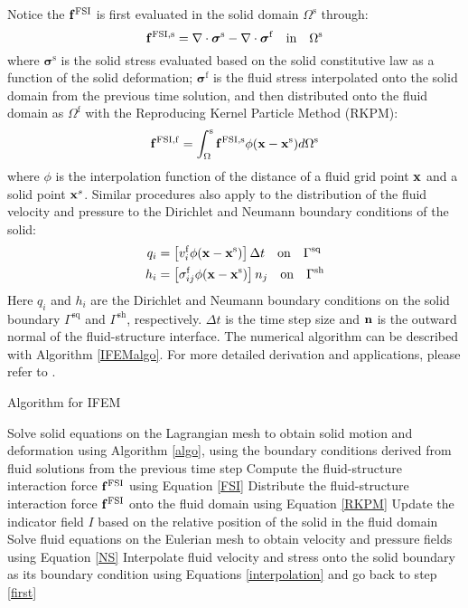 Notice the $\bold{f}^\mathrm{FSI}$ is first evaluated in the solid domain $\Omega^\mathrm{s}$ through:
\begin{equation} \label{FSI}
\bold{f}^\mathrm{FSI,s} = \nabla \cdot \boldsymbol{\sigma}^\mathrm{s} - \nabla \cdot \boldsymbol{\sigma}^\mathrm{f} \quad \mathrm{in} \quad \Omega^\mathrm{s}
\end{equation}
where $\boldsymbol\sigma^\mathrm{s}$ is the solid stress evaluated based on the solid constitutive law as a function of the solid deformation; $\boldsymbol\sigma^\mathrm{f}$ is the fluid stress interpolated onto the solid domain from the previous time solution, and then distributed onto the fluid domain as $\Omega^\mathrm{f}$ with the Reproducing Kernel Particle Method (RKPM):
\begin{equation} \label{RKPM}
\bold{f}^\mathrm{FSI,f} = \int_\Omega^\mathrm{s} \bold{f}^\mathrm{FSI,s}\phi(\bold{x} - \bold{x}^\mathrm{s})d\Omega^\mathrm{s}
\end{equation}
where $\phi$ is the interpolation function of the distance of a fluid grid point $\bold{x}$ and a solid point $\bold{x}^s$. Similar procedures also apply to the distribution of the fluid velocity and pressure to the Dirichlet and Neumann boundary conditions of the solid:
\begin{subequations} \label{interpolation}
\begin{align}
q_i &= \left[ v_i^\mathrm{f} \phi(\bold{x} - \bold{x}^\mathrm{s}) \right]\Delta t \quad \mathrm{on} \quad \Gamma^\mathrm{sq} \\
h_i &= \left[ \sigma_{ij}^\mathrm{f} \phi(\bold{x} - \bold{x}^\mathrm{s}) \right]n_j \quad \mathrm{on} \quad \Gamma^\mathrm{sh}
\end{align}
\end{subequations}
Here $q_i$ and $h_i$ are the Dirichlet and Neumann boundary conditions on the solid boundary $\Gamma^\mathrm{sq}$ and $\Gamma^\mathrm{sh}$, respectively. $\Delta t$ is the time step size and $\bold{n}$ is the outward normal of the fluid-structure interface. The numerical algorithm can be described with Algorithm \ref{IFEMalgo}. For more detailed derivation and applications, please refer to \cite{Lucy, Lucy2, Lucy3, Lucy4}.
\begin{algorithm}
	\caption{Algorithm for IFEM}  \label{IFEMalgo}
	\begin{algorithmic}[1]
	\State Solve solid equations on the Lagrangian mesh to obtain solid motion and deformation using Algorithm \ref{algo}, using the boundary conditions derived from fluid solutions from the previous time step \label{first}
	\State Compute the fluid-structure interaction force $\bold{f}^\mathrm{FSI}$ using Equation \ref{FSI}
	\State Distribute the fluid-structure interaction force $\bold{f}^\mathrm{FSI}$ onto the fluid domain using Equation \ref{RKPM}
	\State Update the indicator field $I$ based on the relative position of the solid in the fluid domain
	\State Solve fluid equations on the Eulerian mesh to obtain velocity and pressure fields using Equation \ref{NS}
	\State Interpolate fluid velocity and stress onto the solid boundary as its boundary condition using Equations \ref{interpolation} and go back to step \ref{first}
	\end{algorithmic}
\end{algorithm}
